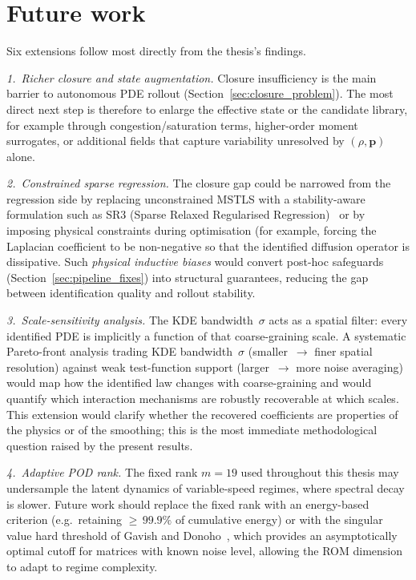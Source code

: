 \section{Future work}
\label{sec:future_work}

Six extensions follow most directly from the thesis's findings.

\emph{1.~Richer closure and state augmentation.}
Closure insufficiency is the main barrier to autonomous PDE rollout
(Section~\ref{sec:closure_problem}).  The most direct next step is therefore
to enlarge the effective state or the candidate library, for example through
congestion/saturation terms, higher-order moment surrogates, or additional
fields that capture variability unresolved by $(\rho,\mathbf{p})$ alone.

\emph{2.~Constrained sparse regression.}
The closure gap could be narrowed from the regression side by replacing
unconstrained MSTLS with a stability-aware formulation such as SR3 (Sparse
Relaxed Regularised Regression)~\cite{zheng2019sr3} or by imposing physical
constraints during optimisation (for example, forcing the Laplacian
coefficient to be non-negative so that the identified diffusion operator
is dissipative.  Such {\em physical inductive biases} would convert
post-hoc safeguards (Section~\ref{sec:pipeline_fixes}) into structural
guarantees, reducing the gap between identification quality and rollout
stability.

\emph{3.~Scale-sensitivity analysis.}
The KDE bandwidth~$\sigma$ acts as a spatial filter: every identified PDE
is implicitly a function of that coarse-graining scale.  A systematic
Pareto-front analysis trading KDE bandwidth~$\sigma$ (smaller~$\to$
finer spatial resolution) against weak test-function support
(larger~$\to$ more noise averaging) would
map how the identified law changes with coarse-graining and would quantify
which interaction mechanisms are robustly recoverable at which scales.
This extension would clarify whether the recovered coefficients are
properties of the physics or of the smoothing; this is the most immediate
methodological question raised by the present results.

\emph{4.~Adaptive POD rank.}
The fixed rank $m{=}19$ used throughout this thesis may undersample the
latent dynamics of variable-speed regimes, where spectral decay is slower.
Future work should replace the fixed rank with an energy-based criterion
(e.g.\ retaining ${\geq}\,99.9\%$ of cumulative energy) or with the
singular value hard threshold of Gavish and
Donoho~\cite{gavish2014svht}, which provides an asymptotically optimal
cutoff for matrices with known noise level, allowing the ROM dimension
to adapt to regime complexity.

